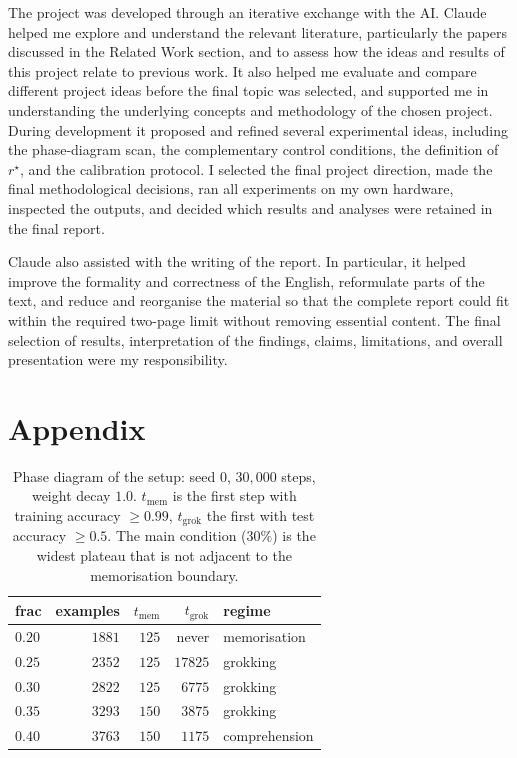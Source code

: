\documentclass{article}
\begin{document}
The project was developed through an iterative exchange with the AI. Claude helped me explore and understand the relevant literature, particularly the papers discussed in the Related Work section, and to assess how the ideas and results of this project relate to previous work. It also helped me evaluate and compare different project ideas before the final topic was selected, and supported me in understanding the underlying concepts and methodology of the chosen project. During development it proposed and refined several experimental ideas, including the phase-diagram scan, the complementary control conditions, the definition of $r^\star$, and the calibration protocol. I selected the final project direction, made the final methodological decisions, ran all experiments on my own hardware, inspected the outputs, and decided which results and analyses were retained in the final report.

Claude also assisted with the writing of the report. In particular, it helped improve the formality and correctness of the English, reformulate parts of the text, and reduce and reorganise the material so that the complete report could fit within the required two-page limit without removing essential content. The final selection of results, interpretation of the findings, claims, limitations, and overall presentation were my responsibility.





\section*{Appendix}

\begin{table}[H]
	\centering
	\caption{Phase diagram of the setup: seed $0$, $30{,}000$ steps, weight decay $1.0$.
		$t_{\text{mem}}$ is the first step with training accuracy $\geq 0.99$,
		$t_{\text{grok}}$ the first with test accuracy $\geq 0.5$. The main condition
		($30\%$) is the widest plateau that is not adjacent to the memorisation boundary.}
	\label{tab:phases}
	\vskip 0.0in
	\begin{small}
		\begin{tabular}{lrrrl}
			\toprule
			frac & examples & $t_{\text{mem}}$ & $t_{\text{grok}}$ & regime \\
			\midrule
			$0.20$ & $1881$ & $125$ & never & memorisation \\
			$0.25$ & $2352$ & $125$ & $17825$ & grokking \\
			$0.30$ & $2822$ & $125$ & $6775$ & grokking \\
			$0.35$ & $3293$ & $150$ & $3875$ & grokking \\
			$0.40$ & $3763$ & $150$ & $1175$ & comprehension \\
			\bottomrule
		\end{tabular}
	\end{small}
\end{table}
\end{document}
